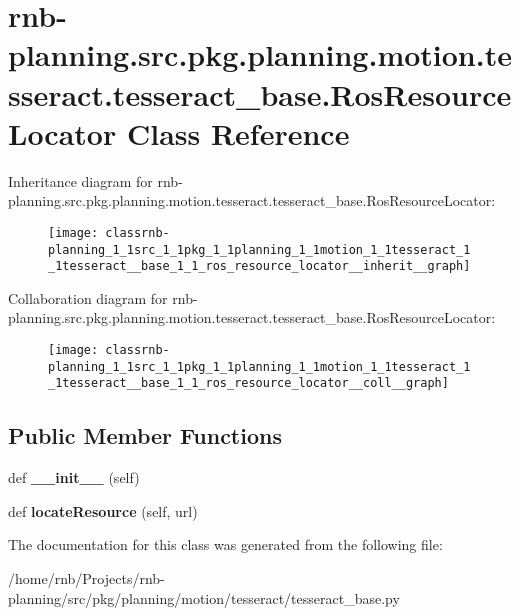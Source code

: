 \hypertarget{classrnb-planning_1_1src_1_1pkg_1_1planning_1_1motion_1_1tesseract_1_1tesseract__base_1_1_ros_resource_locator}{}\section{rnb-\/planning.src.\+pkg.\+planning.\+motion.\+tesseract.\+tesseract\+\_\+base.\+Ros\+Resource\+Locator Class Reference}
\label{classrnb-planning_1_1src_1_1pkg_1_1planning_1_1motion_1_1tesseract_1_1tesseract__base_1_1_ros_resource_locator}


Inheritance diagram for rnb-\/planning.src.\+pkg.\+planning.\+motion.\+tesseract.\+tesseract\+\_\+base.\+Ros\+Resource\+Locator\+:\nopagebreak
\begin{figure}[H]
\begin{center}
\leavevmode
\texttt{[image: classrnb-planning\_1\_1src\_1\_1pkg\_1\_1planning\_1\_1motion\_1\_1tesseract\_1\_1tesseract\_\_base\_1\_1\_ros\_resource\_locator\_\_inherit\_\_graph]}
\end{center}
\end{figure}


Collaboration diagram for rnb-\/planning.src.\+pkg.\+planning.\+motion.\+tesseract.\+tesseract\+\_\+base.\+Ros\+Resource\+Locator\+:\nopagebreak
\begin{figure}[H]
\begin{center}
\leavevmode
\texttt{[image: classrnb-planning\_1\_1src\_1\_1pkg\_1\_1planning\_1\_1motion\_1\_1tesseract\_1\_1tesseract\_\_base\_1\_1\_ros\_resource\_locator\_\_coll\_\_graph]}
\end{center}
\end{figure}
\subsection*{Public Member Functions}
\begin{DoxyCompactItemize}
\item 
\mbox{\label{classrnb-planning_1_1src_1_1pkg_1_1planning_1_1motion_1_1tesseract_1_1tesseract__base_1_1_ros_resource_locator_a0cdf328eb7ecb6649d9ee033d437f7f5}} 
def {\bfseries \+\_\+\+\_\+init\+\_\+\+\_\+} (self)
\item 
\mbox{\label{classrnb-planning_1_1src_1_1pkg_1_1planning_1_1motion_1_1tesseract_1_1tesseract__base_1_1_ros_resource_locator_a5645f7bd3b4aa5d4751e2ec1aee94e82}} 
def {\bfseries locate\+Resource} (self, url)
\end{DoxyCompactItemize}


The documentation for this class was generated from the following file\+:\begin{DoxyCompactItemize}
\item 
/home/rnb/\+Projects/rnb-\/planning/src/pkg/planning/motion/tesseract/tesseract\+\_\+base.\+py\end{DoxyCompactItemize}
